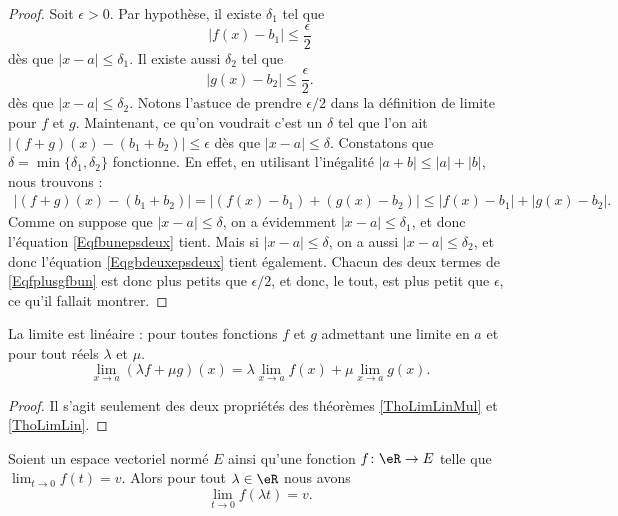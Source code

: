 \begin{proof}
	Soit \( \epsilon>0\). Par hypothèse, il existe \( \delta_1\) tel que
	\begin{equation}    \label{Eqfbunepsdeux}
		| f(x)-b_1 |\leq \frac{ \epsilon }{ 2 }
	\end{equation}
	dès que \( | x-a |\leq\delta_1\). Il existe aussi \( \delta_2\) tel que
	\begin{equation}    \label{Eqgbdeuxepsdeux}
		| g(x)-b_2 |\leq \frac{ \epsilon }{ 2 }.
	\end{equation}
	dès que \( | x-a |\leq \delta_2\). Notons l'astuce de prendre \( \epsilon/2\) dans la définition de limite pour \( f\) et \( g\). Maintenant, ce qu'on voudrait c'est un \( \delta\) tel que l'on ait \( | (f+g)(x)-(b_1+b_2) |\leq \epsilon\) dès que \( | x-a |\leq \delta\). Constatons que \( \delta=\min\{ \delta_1,\delta_2 \}\) fonctionne. En effet, en utilisant l'inégalité \( | a+b |\leq | a |+| b |\), nous trouvons :
	\begin{align}
		| (f+g)(x)-(b_1+b_2) |=| (f(x)-b_1)+(g(x)-b_2) |
		\leq | f(x)-b_1 |+| g(x)-b_2 |.     \label{Eqfplusgfbun}
	\end{align}
	Comme on suppose que \( | x-a |\leq\delta\), on a évidemment \( | x-a |\leq\delta_1\), et donc l'équation \eqref{Eqfbunepsdeux} tient. Mais si \( | x-a |\leq\delta\), on a aussi \( | x-a |\leq\delta_2\), et donc l'équation  \eqref{Eqgbdeuxepsdeux} tient également. Chacun des deux termes de \eqref{Eqfplusgfbun} est donc plus petits que \( \epsilon/2\), et donc, le tout, est plus petit que \( \epsilon\), ce qu'il fallait montrer.
\end{proof}

\begin{proposition}     \label{PROPooVLBWooVttvFK}
	La limite est linéaire : pour toutes fonctions \( f\) et \( g\) admettant une limite en \( a\) et pour tout réels \( \lambda\) et \( \mu\).
	\begin{equation}
		\lim_{x\to a} (\lambda f+\mu g)(x)=\lambda\lim_{x\to a} f(x)+\mu\lim_{x\to a} g(x).
	\end{equation}
\end{proposition}

\begin{proof}
	Il s'agit seulement des deux propriétés des théorèmes \ref{ThoLimLinMul} et \ref{ThoLimLin}.
\end{proof}

\begin{lemma}       \label{LEMooYJGLooVBaglB}
	Soient un espace vectoriel normé \( E\) ainsi qu'une fonction \( f\colon \eR\to E\) telle que \( \lim_{t\to 0} f(t)=v\). Alors pour tout \( \lambda\in \eR\) nous avons
	\begin{equation}
		\lim_{t\to 0} f(\lambda t)=v.
	\end{equation}
\end{lemma}

